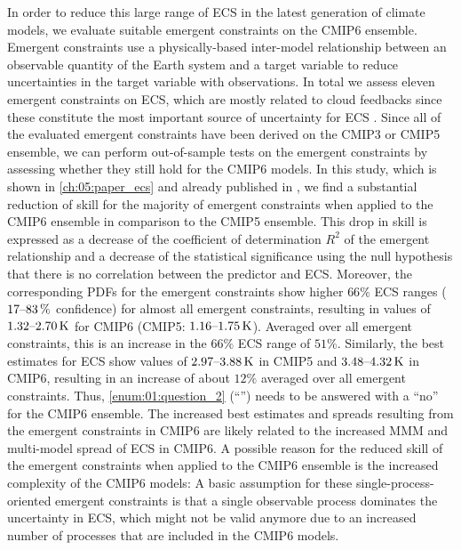 In order to reduce this large range of \ac{ECS} in the latest generation of
climate  models, we evaluate suitable emergent constraints on the \acs{CMIP}6
ensemble. Emergent constraints use a physically-based inter-model relationship
between an observable quantity of the Earth system and a target variable to
reduce uncertainties in the target variable with observations. In total we
assess eleven emergent constraints on \ac{ECS}, which are mostly related to
cloud feedbacks since these constitute the most important source of uncertainty
for \ac{ECS} \autocite{Boucher2013, Flato2013}. Since all of the evaluated
emergent constraints have been derived on the \acs{CMIP}3 or \acs{CMIP}5
ensemble, we can perform out-of-sample tests on the emergent constraints by
assessing whether they still hold for the \acs{CMIP}6 models. In this study,
which is shown in \cref{ch:05:paper_ecs} and already published in
\textcite{Schlund2020a}, we find a substantial reduction of skill for the
majority of emergent constraints when applied to the \acs{CMIP}6 ensemble in
comparison to the \acs{CMIP}5 ensemble. This drop in skill is expressed as a
decrease of the coefficient of determination $R^2$ of the emergent relationship
and a decrease of the statistical significance using the null hypothesis that
there is no correlation between the predictor and \ac{ECS}. Moreover, the
corresponding \acp{PDF} for the emergent constraints show higher $66 \unit{\%}$
\ac{ECS} ranges ($\rangeunit{17}{83}{\%}$ confidence) for almost all emergent
constraints, resulting in values of $\rangeunit{1.32}{2.70}{K}$ for \acs{CMIP}6
(\acs{CMIP}5: $\rangeunit{1.16}{1.75}{K}$). Averaged over all emergent
constraints, this is an increase in the $66 \unit{\%}$ \ac{ECS} range of $51
\unit{\%}$. Similarly, the best estimates for \ac{ECS} show values of
$\rangeunit{2.97}{3.88}{K}$ in \acs{CMIP}5 and $\rangeunit{3.48}{4.32}{K}$ in
\acs{CMIP}6, resulting in an increase of about $12 \unit{\%}$ averaged over all
emergent constraints. Thus, \cref{enum:01:question_2}
(\enquote{\KeyScienceQuestionTwo{}}) needs to be answered with a \enquote{no}
for the \acs{CMIP}6 ensemble. The increased best estimates and spreads
resulting from the emergent constraints in \acs{CMIP}6 are likely related to
the increased \ac{MMM} and multi-model spread of \ac{ECS} in \acs{CMIP}6. A
possible reason for the reduced skill of the emergent constraints when applied
to the \acs{CMIP}6 ensemble is the increased complexity of the \acs{CMIP}6
models: A basic assumption for these single-process-oriented emergent
constraints is that a single observable process dominates the uncertainty in
\ac{ECS}, which might not be valid anymore due to an increased number of
processes that are included in the \acs{CMIP}6 models.

